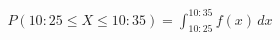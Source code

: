 \documentclass[preview]{standalone}
\begin{document}
\begin{align*}
P(10:25 \le X \le 10:35) = \int_{10:25}^{10:35} f(x) \, dx
\end{align*}
\end{document}
